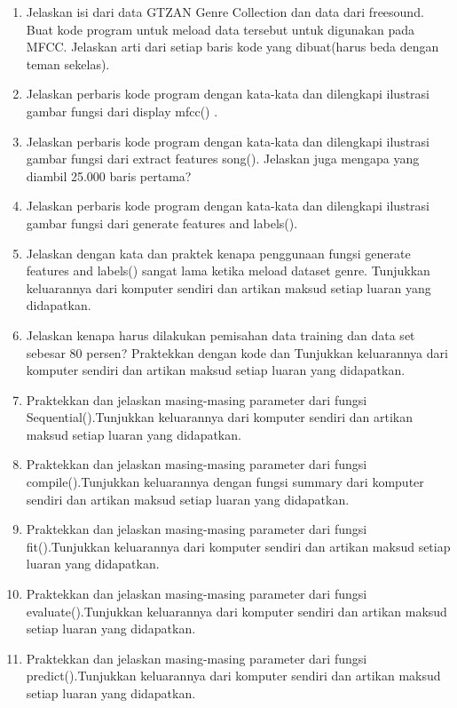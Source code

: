 \begin{enumerate}
    \item Jelaskan isi dari data GTZAN Genre Collection dan data dari freesound. Buat kode program untuk meload data tersebut untuk digunakan pada MFCC. Jelaskan arti dari setiap baris kode yang dibuat(harus beda dengan teman sekelas).

    \item Jelaskan perbaris kode program dengan kata-kata dan dilengkapi ilustrasi gambar fungsi dari display mfcc() .

    \item Jelaskan perbaris kode program dengan kata-kata dan dilengkapi ilustrasi gambar fungsi dari extract features song(). Jelaskan juga mengapa yang diambil 25.000 baris pertama?

    \item Jelaskan perbaris kode program dengan kata-kata dan dilengkapi ilustrasi gambar fungsi dari generate features and labels().

    \item Jelaskan dengan kata dan praktek kenapa penggunaan fungsi generate features and labels() sangat lama ketika meload dataset genre. Tunjukkan keluarannya dari komputer sendiri dan artikan maksud setiap luaran yang didapatkan.

    \item Jelaskan kenapa harus dilakukan pemisahan data training dan data set sebesar 80 persen? Praktekkan dengan kode dan Tunjukkan keluarannya dari komputer sendiri dan artikan maksud setiap luaran yang didapatkan.

    \item Praktekkan dan jelaskan masing-masing parameter dari fungsi Sequential().Tunjukkan keluarannya dari komputer sendiri dan artikan maksud setiap luaran yang didapatkan.

    \item Praktekkan dan jelaskan masing-masing parameter dari fungsi compile().Tunjukkan keluarannya dengan fungsi summary dari komputer sendiri dan artikan maksud setiap luaran yang didapatkan.

    \item Praktekkan dan jelaskan masing-masing parameter dari fungsi fit().Tunjukkan keluarannya dari komputer sendiri dan artikan maksud setiap luaran yang didapatkan.

    \item Praktekkan dan jelaskan masing-masing parameter dari fungsi evaluate().Tunjukkan keluarannya dari komputer sendiri dan artikan maksud setiap luaran yang didapatkan.

    \item Praktekkan dan jelaskan masing-masing parameter dari fungsi predict().Tunjukkan keluarannya dari komputer sendiri dan artikan maksud setiap luaran yang didapatkan.
\end{enumerate}
